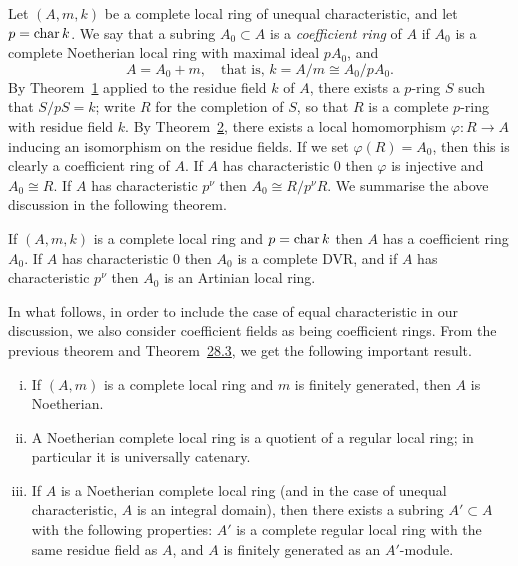 Let $(A, m, k)$ be a complete local ring of unequal characteristic, and let
$p = \operatorname{char} k$. We say that a subring $A_0 \subset A$ is a \emph{coefficient ring}
of $A$ if $A_0$ is a complete Noetherian local ring with maximal ideal $pA_0$, and
\[
  A = A_0 + m, \quad \text{that is, } k = A/m \cong A_0/pA_0.
\]
By Theorem~\hyperref[thm:29.1]{1} applied to the residue field $k$ of $A$, there exists a $p$-ring
$S$ such that $S/pS = k$; write $R$ for the completion of $S$, so that $R$ is a
complete $p$-ring with residue field $k$. By Theorem~\hyperref[thm:29.2]{2}, there exists a local
homomorphism $\varphi\colon R \to A$ inducing an isomorphism on the residue fields. If
we set $\varphi(R) = A_0$, then this is clearly a coefficient ring of $A$. If $A$ has
characteristic $0$ then $\varphi$ is injective and $A_0 \cong R$. If $A$ has
characteristic $p^\nu$ then $A_0 \cong R/p^\nu R$. We summarise the above discussion in
the following theorem.

\begin{theorem}\label{thm:29.4}
If $(A, m, k)$ is a complete local ring and $p = \operatorname{char} k$ then $A$ has a coefficient
ring $A_0$. If $A$ has characteristic $0$ then $A_0$ is a complete DVR, and if $A$ has
characteristic $p^\nu$ then $A_0$ is an Artinian local ring.
\end{theorem}

In what follows, in order to include the case of equal characteristic in our
discussion, we also consider coefficient fields as being coefficient rings.
From the previous theorem and Theorem~\hyperref[thm:28.3]{28.3}, we get the following
important result.

\begin{theorem}\label{thm:29.5}
\begin{enumerate}[(i)]
  \item If $(A, m)$ is a complete local ring and $m$ is finitely generated, then $A$
        is Noetherian.
  \item A Noetherian complete local ring is a quotient of a regular local ring;
        in particular it is universally catenary.
  \item If $A$ is a Noetherian complete local ring (and in the case of unequal
        characteristic, $A$ is an integral domain), then there exists a subring
        $A' \subset A$ with the following properties: $A'$ is a complete regular local
        ring with the same residue field as $A$, and $A$ is finitely generated as an
        $A'$-module.
\end{enumerate}
\end{theorem}

